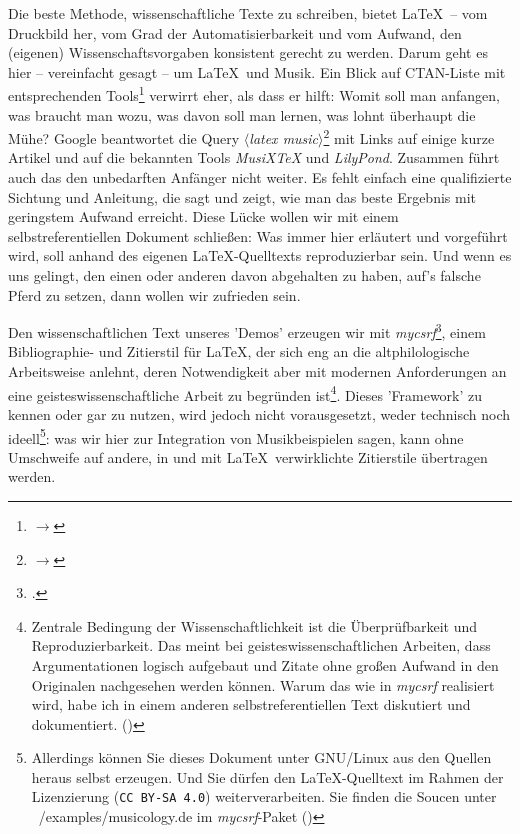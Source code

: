 Die beste Methode, wissenschaftliche Texte zu schreiben, bietet \LaTeX\ -- vom
Druckbild her, vom Grad der Automatisierbarkeit und vom Aufwand, den (ei\-ge\-nen)
Wissenschaftsvorgaben konsistent gerecht zu werden. Darum geht es hier --
vereinfacht gesagt -- um \LaTeX\ und Musik. Ein Blick auf CTAN-Liste mit
entsprechenden Tools\footnote{$\rightarrow$
} verwirrt eher, als dass er
hilft: Womit soll man anfangen, was braucht man wozu, was davon soll man lernen,
was lohnt überhaupt die Mühe? Google beantwortet die Query
$\langle$\textit{latex music}$\rangle$\footnote{$\rightarrow$
} mit Links auf einige kurze
Artikel und auf die bekannten Tools \textit{MusiX\TeX} und \textit{LilyPond}.
Zusammen führt auch das den unbedarften Anfänger nicht weiter. Es fehlt einfach
eine qualifizierte Sichtung und Anleitung, die sagt und zeigt, wie man das beste
Ergebnis mit geringstem Aufwand erreicht. Diese Lücke wollen wir mit einem
selbstreferentiellen Dokument schließen: Was immer hier erläutert und vorgeführt
wird, soll anhand des eigenen \LaTeX-Quelltexts reproduzierbar sein. Und wenn es
uns gelingt, den einen oder anderen davon abgehalten zu haben, auf's falsche
Pferd zu setzen, dann wollen wir zufrieden sein.

Den wissenschaftlichen Text unseres 'Demos' erzeugen wir mit
\textit{mycsrf}\footcite[vgl.][\nopage wp]{Reincke2018a}, einem Bibliographie- und
Zitierstil für \LaTeX, der sich eng an die altphilologische Arbeitsweise
anlehnt, deren Notwendigkeit aber mit modernen Anforderungen an eine
geisteswissenschaftliche Arbeit zu begründen ist\footnote{Zentrale Bedingung der
Wissenschaftlichkeit ist die Überprüfbarkeit und Reproduzierbarkeit. Das meint
bei geisteswissenschaftlichen Arbeiten, dass Argumentationen logisch aufgebaut
und Zitate ohne großen Aufwand in den Originalen nachgesehen werden können.
Warum das wie in \textit{mycsrf} realisiert wird, habe ich in einem anderen
selbstreferentiellen Text diskutiert und dokumentiert. (\cite[Vgl.
dazu][1ff]{Reincke2018b})}. Dieses 'Framework' zu kennen oder gar zu nutzen,
wird jedoch nicht vorausgesetzt, weder technisch noch ideell\footnote{Allerdings
können Sie dieses Dokument unter GNU/Linux aus den Quellen heraus selbst
erzeugen. Und Sie dürfen den \LaTeX-Quelltext im Rahmen der Lizenzierung
(\texttt{CC BY-SA 4.0}) weiterverarbeiten. Sie finden die Soucen unter
~/examples/musicology.de im \textit{mycsrf}-Paket (\cite[Vgl. dazu][\nopage
wp]{Reincke2019a})}: was wir hier zur Integration von
Musikbeispielen sagen, kann ohne Umschweife auf andere, in und mit \LaTeX\
verwirklichte Zitierstile übertragen werden.


